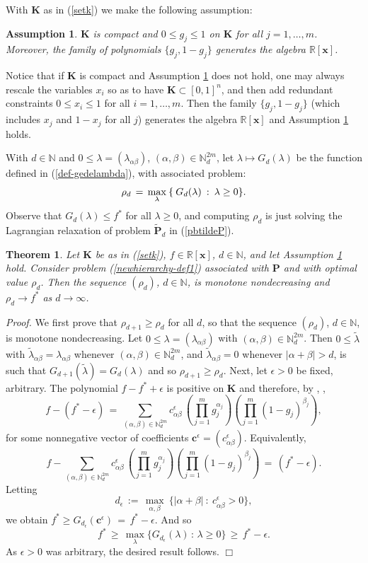 \documentclass[11pt]{article}
\newtheorem{theorem}{Theorem}[section]
\newtheorem{assumption}{Assumption}
\numberwithin{equation}{section}
\def\x{\mathbf{x}}
\def\R{\mathbb{R}}
\def\N{\mathbb{N}}
\def\K{\mathbf{K}}
\def\P{\mathbf{P}}
\def\c{\mathbf{C}}
\def\c{\mathbf{c}}
\def\blambda{{\boldmath{\lambda}}}
\begin{document}
With $\K$ as in (\ref{setk}) we make the following assumption:
\begin{assumption}
\label{ass1}
$\K$ is compact and $0\leq g_j\leq 1$ on $\K$ for all
$j=1,\ldots,m$. Moreover, the family of polynomials $\{g_j, 1-g_j\}$ generates the algebra $\R[\x]$.
\end{assumption}
Notice that if $\K$ is compact and Assumption \ref{ass1} does not hold, one may always rescale
the variables $x_i$ so as to have $\K\subset [0,1]^n$, and then add redundant constraints
$0\leq x_i\leq 1$ for all $i=1,\ldots,m$. Then the family $\{g_j,1-g_j\}$ (which includes $x_j$ and $1-x_j$ for all $j$)
generates the algebra $\R[\x]$ and Assumption \ref{ass1} holds.

With $d\in\N$ and $0\leq \lambda=(\lambda_{\alpha\beta})$, $(\alpha,\beta)\in\N^{2m}_{d}$, 
let $\lambda\mapsto G_d(\lambda)$ be the function defined in (\ref{def-gedelambda}),
with associated problem:
\begin{equation}
\label{newhierarchy-def1}
\rho_d\,=\,\max_{\blambda}\:\{\:G_d(\lambda)\::\: \blambda\geq0\}.
\end{equation}
Observe that $G_d(\lambda)\leq f^*$ for all $\lambda\geq0$, and 
computing $\rho_d$ is just solving the Lagrangian relaxation of problem $\tilde{\P}_d$ in (\ref{pbtildeP}).

\begin{theorem}
\label{thmain}
Let $\K$ be as in (\ref{setk}), $f\in\R[\x]$, $d\in\N$, and let Assumption \ref{ass1} hold. Consider problem 
(\ref{newhierarchy-def1}) associated with $\P$
and with optimal value $\rho_d$. 
Then the sequence $(\rho_d)$, $d\in\N$,  is monotone nondecreasing and $\rho_d\to f^*$ as $d\to\infty$.
\end{theorem}
{\it Proof.}
We first prove that $\rho_{d+1}\geq\rho_d$ for all $d$, so that  the sequence $(\rho_d)$, $d\in\N$,  is monotone nondecreasing.
Let $0\leq\lambda=(\lambda_{\alpha\beta})$ with $(\alpha,\beta)\in\N^{2m}_{d}$. Then
$0\leq\tilde{\lambda}$ with $\tilde{\lambda}_{\alpha\beta}=\lambda_{\alpha\beta}$ whenever $(\alpha,\beta)\in\N^{2m}_{d}$, and
$\tilde{\lambda}_{\alpha\beta}=0$ whenever $\vert\alpha+\beta\vert>d$,
is such that $G_{d+1}(\tilde{\lambda})=G_{d}(\lambda)$ and so $\rho_{d+1}\geq\rho_d$.
Next, let $\epsilon>0$ be fixed, arbitrary. The polynomial $f-f^*+\epsilon$ is positive on $\K$ and therefore, by 
\cite{Stengle74}, \cite[Theorem 2.23]{lasserre-imperial},
\[f-(f^*-\epsilon)\,=\,\sum_{(\alpha,\beta)\in\N^{2m}_d}c^\epsilon_{\alpha\beta}\,\left(\prod_{j=1}^mg_j^{\alpha_j}\right)\left(\prod_{j=1}^m(1-g_j)^{\beta_j}\right),\]
for some nonnegative vector of coefficients $\c^\epsilon=(c_{\alpha\beta}^\epsilon)$. Equivalently, 
\[f-\sum_{(\alpha,\beta)\in\N^{2m}_d}c^\epsilon_{\alpha\beta}\,\left(\prod_{j=1}^mg_j^{\alpha_j}\right)\left(\prod_{j=1}^m(1-g_j)^{\beta_j}\right)\,=\,(f^*-\epsilon).\]
Letting
\[d_\epsilon\,:=\,\max_{\alpha,\beta}\:\{\vert\alpha+\beta\vert\::\:c^\epsilon_{\alpha\beta}>0\},\]
we obtain $f^*\geq G_{d_\epsilon}(\c^\epsilon)\,=\,f^*-\epsilon$. And so 
\[f^*\,\geq\,\max_\lambda\{G_{d_\epsilon}(\lambda)\,:\,\lambda\geq0\}\,\geq\,f^*-\epsilon.\]
As $\epsilon>0$ was arbitrary, the desired result follows.
$\Box$
\vspace{0.2cm}
\end{document}
